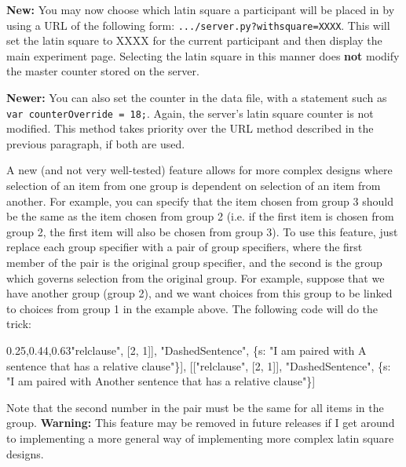 \documentclass[
]{article}
\newenvironment{Shaded}{}{}
\newcommand{\DataTypeTok}[1]{\textcolor[rgb]{0.56,0.13,0.00}{#1}}
\newcommand{\DecValTok}[1]{\textcolor[rgb]{0.25,0.63,0.44}{#1}}
\newcommand{\NormalTok}[1]{#1}
\newcommand{\OperatorTok}[1]{\textcolor[rgb]{0.40,0.40,0.40}{#1}}
\newcommand{\StringTok}[1]{\textcolor[rgb]{0.25,0.44,0.63}{#1}}
\begin{document}
\textbf{New:} You may now choose which latin square a participant will
be placed in by using a URL of the following form:
\texttt{.../server.py?withsquare=XXXX}. This will set the latin square
to XXXX for the current participant and then display the main experiment
page. Selecting the latin square in this manner does \textbf{not} modify
the master counter stored on the server.

\textbf{Newer:} You can also set the counter in the data file, with a
statement such as \texttt{var\ counterOverride\ =\ 18;}. Again, the
server's latin square counter is not modified. This method takes
priority over the URL method described in the previous paragraph, if
both are used.

A new (and not very well-tested) feature allows for more complex designs
where selection of an item from one group is dependent on selection of
an item from another. For example, you can specify that the item chosen
from group 3 should be the same as the item chosen from group 2 (i.e. if
the first item is chosen from group 2, the first item will also be
chosen from group 3). To use this feature, just replace each group
specifier with a pair of group specifiers, where the first member of the
pair is the original group specifier, and the second is the group which
governs selection from the original group. For example, suppose that we
have another group (group 2), and we want choices from this group to be
linked to choices from group 1 in the example above. The following code
will do the trick:

\begin{Shaded}
\begin{Highlighting}[]
\NormalTok{    [[}\StringTok{"relclause"}\OperatorTok{,}\NormalTok{ [}\DecValTok{2}\OperatorTok{,} \DecValTok{1}\NormalTok{]]}\OperatorTok{,} \StringTok{"DashedSentence"}\OperatorTok{,}
\NormalTok{      \{}\DataTypeTok{s}\OperatorTok{:} \StringTok{"I am paired with \textquotesingle{}A sentence that has a relative clause\textquotesingle{}"}\NormalTok{\}]}\OperatorTok{,}
\NormalTok{    [[}\StringTok{"relclause"}\OperatorTok{,}\NormalTok{ [}\DecValTok{2}\OperatorTok{,} \DecValTok{1}\NormalTok{]]}\OperatorTok{,} \StringTok{"DashedSentence"}\OperatorTok{,}
\NormalTok{      \{}\DataTypeTok{s}\OperatorTok{:} \StringTok{"I am paired with \textquotesingle{}Another sentence that has a relative clause\textquotesingle{}"}\NormalTok{\}]}
\end{Highlighting}
\end{Shaded}

Note that the second number in the pair must be the same for all items
in the group. \textbf{Warning:} This feature may be removed in future
releases if I get around to implementing a more general way of
implementing more complex latin square designs.
\end{document}
